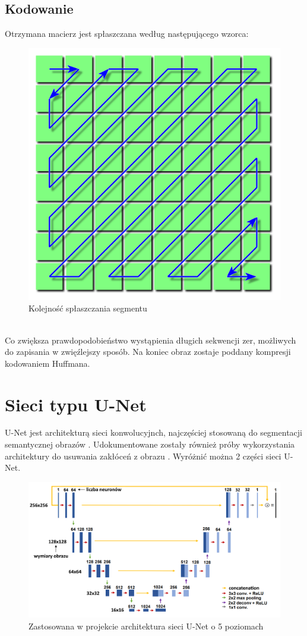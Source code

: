 \documentclass[a4paper, 12pt]{article}
\begin{document}
\subsection{Kodowanie}
Otrzymana macierz jest spłaszczana według następującego wzorca:
\begin{figure}[h!]
	\begin{center}
	\includegraphics[width=0.5\columnwidth]{pattern.png}
	\caption{Kolejność spłaszczania segmentu}
\end{center}
\end{figure}
\\
Co zwiększa prawdopodobieństwo wystąpienia długich sekwencji zer, możliwych do zapisania w zwięźlejszy sposób.
Na koniec obraz zostaje poddany kompresji kodowaniem Huffmana.
\newpage
\section{Sieci typu U-Net}
U-Net jest architekturą sieci konwolucyjnch, najczęściej stosowaną do segmentacji semantycznej obrazów \cite{ronneberger2015unet}.
Udokumentowane zostały również próby wykorzystania architektury do usuwania zakłóceń z obrazu \cite{antholzer2018deep} .
Wyróżnić można 2 części sieci U-Net.
\begin{figure}[h!]
	\begin{center}
	\includegraphics[width=0.9\columnwidth]{unet.png}
	\caption{Zastosowana w projekcie architektura sieci U-Net o 5 poziomach \cite{ronneberger2015unet}}
\end{center}
\end{figure}
\end{document}
